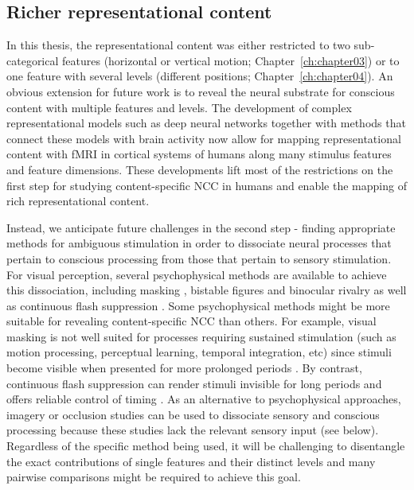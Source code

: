 \subsection{Richer representational content}
In this thesis, the representational content was either restricted to two sub-categorical features (horizontal or vertical motion; Chapter~\ref{ch:chapter03}) or to one feature with several levels (different positions; Chapter~\ref{ch:chapter04}). An obvious extension for future work is to reveal the neural substrate for conscious content with multiple features and levels. The development of complex representational models such as deep neural networks \parencite{Kriegeskorte2014, Kriegeskorte2015, Yamins2016, Bashivan2019} together with methods that connect these models with brain activity \parencite{Kriegeskorte2008, Naselaris2011, Diedrichsen2017, Diedrichsen2018} now allow for mapping representational content with fMRI in cortical systems of humans along many stimulus features and feature dimensions. These developments lift most of the restrictions on the first step for studying content-specific NCC in humans and enable the mapping of rich representational content.  

Instead, we anticipate future challenges in the second step - finding appropriate methods for ambiguous stimulation in order to dissociate neural processes that pertain to conscious processing from those that pertain to sensory stimulation. For visual perception, several psychophysical methods are available to achieve this dissociation, including masking \parencite{Kouider2007, Breitmeyer2010}, bistable figures and binocular rivalry \parencite{Kim2005} as well as continuous flash suppression \parencite{Tsuchiya2005}. Some psychophysical methods might be more suitable for revealing content-specific NCC than others. For example, visual masking is not well suited for processes requiring sustained stimulation (such as motion processing, perceptual learning, temporal integration, etc) since stimuli become visible when presented for more prolonged periods \parencite{Faivre2014}. By contrast, continuous flash suppression can render stimuli invisible for long periods and offers reliable control of timing \parencite{Tsuchiya2005, Faivre2014}. As an alternative to psychophysical approaches, imagery or occlusion \parencite{Muckli2015} studies can be used to dissociate sensory and conscious processing because these studies lack the relevant sensory input (see below). Regardless of the specific method being used, it will be challenging to disentangle the exact contributions of single features and their distinct levels and many pairwise comparisons might be required to achieve this goal.

